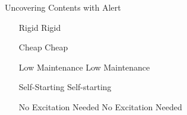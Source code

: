 \documentclass[aspectratio=169, xcolor={x11names}]{beamer}
\begin{document}
\begin{frame}{Uncovering Contents with Alert}

\begin{itemize}[<+->]
    \item[Rigid] Rigid
    \item[Cheap] Cheap
    \item[Low Maintenance] Low Maintenance%
    \item[Self-Starting] Self-starting
    \item[No Excitation Needed] No Excitation Needed
\end{itemize}

\end{frame}
\end{document}
